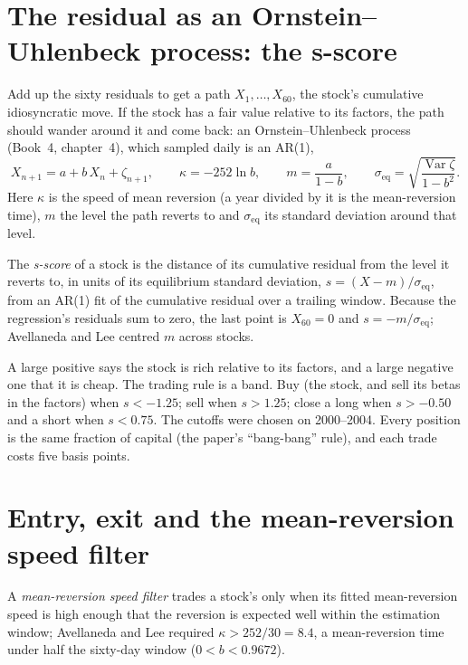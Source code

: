 \section{The residual as an Ornstein--Uhlenbeck process: the s-score}

Add up the sixty residuals to get a path $X_1, \dots, X_{60}$, the stock's cumulative idiosyncratic move. If the stock has a fair value relative to its
factors, the path should wander around it and come back: an Ornstein--Uhlenbeck process (Book~4, chapter~4), which sampled daily is an AR(1),
\[
X_{n+1} = a + b\,X_n + \zeta_{n+1},\qquad \kappa = -252\ln b,\qquad m = \frac{a}{1-b},\qquad \sigma_{\mathrm{eq}} = \sqrt{\frac{\operatorname{Var}\zeta}{1-b^2}}.
\]
Here $\kappa$ is the speed of mean reversion (a year divided by it is the mean-reversion time), $m$ the level the path reverts to and $\sigma_{\mathrm{eq}}$
its standard deviation around that level.

\begin{definition}[s-score]\label{def:s1:residual-and-principal-component-stat-arb:sscore}
The \emph{s-score} of a stock is the distance of its cumulative residual from the level it reverts to, in units of its equilibrium standard
deviation, $s = (X - m)/\sigma_{\mathrm{eq}}$, from an AR(1) fit of the cumulative residual over a trailing window. Because the regression's residuals sum to
zero, the last point is $X_{60} = 0$ and $s = -m/\sigma_{\mathrm{eq}}$; Avellaneda and Lee centred $m$ across stocks.
\end{definition}

A large positive  says the stock is rich relative to its factors, and a large negative one that it is cheap. The trading rule is a band. Buy (the
stock, and sell its betas in the factors) when $s < -1.25$; sell when $s > 1.25$; close a long when $s > -0.50$ and a short when $s < 0.75$. The cutoffs were
chosen on 2000--2004. Every position is the same fraction of capital (the paper's ``bang-bang'' rule), and each trade costs five basis points.

\section{Entry, exit and the mean-reversion speed filter}

\begin{definition}\label{def:s1:residual-and-principal-component-stat-arb:speed}
A \emph{mean-reversion speed filter} trades a stock's  only when its fitted mean-reversion speed is high enough
that the reversion is expected well within the estimation window; Avellaneda and Lee required $\kappa > 252/30 = 8.4$, a mean-reversion time under half the
sixty-day window ($0 < b < 0.9672$).
\end{definition}

